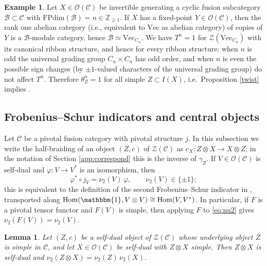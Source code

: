 \documentclass[10pt]{article}
\theoremstyle{plain}
\newtheorem{lemma}[theorem]{Lemma}
\theoremstyle{definition}
\newtheorem{example}[theorem]{Example}
\theoremstyle{plain}
\begin{document}
\begin{example}\label{exfix}
    Let $X\in\mathcal{O}(\mathcal{C})$ be invertible generating a cyclic fusion subcategory $\mathcal{B}\subset\mathcal{C}$ with $\mathrm{FPdim}(\mathcal{B})=n\in\mathbb{Z}_{\geq1}$. If $X$ has a fixed-point $Y\in\mathcal{O}(\mathcal{C})$, then the rank one abelian category (i.e., equivalent to $\text{Vec}$ as abelian category) of copies  of $Y$ is a $\mathcal{B}$-module category, hence $\mathcal{B}\simeq\mathrm{Vec}_{C_n}$. We have $T^n=1$ for $\mathcal{Z}(\mathrm{Vec}_{C_n})$ with its canonical ribbon structure, and hence for every ribbon structure: when $n$ is odd the universal grading group $C_n\times C_n$ has odd order, and when $n$ is even the possible sign changes (by $\pm1$-valued characters of the universal grading group) do not affect $T^n$. Therefore $\theta_Z^n=1$ for all simple $Z\subset I(X)$, i.e.\ Proposition \ref{twist} implies \cite[Proposition 3.11]{MR4655273}.
\end{example} 

\subsection{Frobenius--Schur indicators and central objects}\label{subsec:nucentral}

Let $\mathcal{C}$ be a pivotal fusion category with pivotal structure $j$. In this subsection we write the half-braiding of an object $(Z,c)$ of $\mathcal{Z}(\mathcal{C})$ as $c_X\colon Z\otimes X\to X\otimes Z$; in the notation of Section \ref{app:correspond} this is the inverse of $\gamma_Z$. If $V\in\mathcal{O}(\mathcal{C})$ is self-dual and $\varphi\colon V\to V^\ast$ is an isomorphism, then
\begin{equation}\label{eq:nu2}
\varphi^\ast\circ j_V=\nu_2(V)\,\varphi,\qquad \nu_2(V)\in\{\pm1\};
\end{equation}
this is equivalent to the definition of the second Frobenius--Schur indicator in \cite{MR2381536}, transported along $\mathrm{Hom}(\mathbbm{1},V\otimes V)\cong\mathrm{Hom}(V,V^\ast)$. In particular, if $F$ is a pivotal tensor functor and $F(V)$ is simple, then applying $F$ to \eqref{eq:nu2} gives $\nu_2(F(V))=\nu_2(V)$.

\begin{lemma}\label{lem:nucentral}
Let $(Z,c)$ be a self-dual object of $\mathcal{Z}(\mathcal{C})$ whose underlying object $Z$ is simple in $\mathcal{C}$, and let $X\in\mathcal{O}(\mathcal{C})$ be self-dual with $Z\otimes X$ simple. Then $Z\otimes X$ is self-dual and $\nu_2(Z\otimes X)=\nu_2(Z)\,\nu_2(X)$.
\end{lemma}
\end{document}
